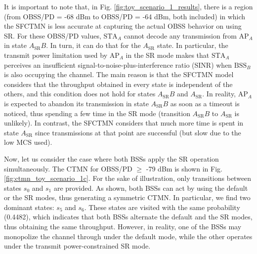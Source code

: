 \documentclass{ieeeaccess}
\begin{document}
It is important to note that, in Fig. \ref{fig:toy_scenario_1_results}, there is a region (from OBSS/PD = -68 dBm to OBSS/PD = -64 dBm, both included) in which the SFCTMN is less accurate at capturing the actual OBSS behavior on using SR. For these OBSS/PD values, $\text{STA}_A$ cannot decode any transmission from $\text{AP}_A$ in state $A_\text{SR}B$. In turn, it can do that for the $A_\text{SR}$ state. In particular, the transmit power limitation used by $\text{AP}_A$ in the SR mode makes that $\text{STA}_A$ perceives an insufficient signal-to-noise-plus-interference ratio (SINR) when $\text{BSS}_B$ is also occupying the channel. The main reason is that the SFCTMN model considers that the throughput obtained in every state is independent of the others, and this condition does not hold for states $A_\text{SR}B$ and $A_\text{SR}$. In reality, $\text{AP}_A$ is expected to abandon its transmission in state $A_\text{SR}B$ as soon as a timeout is noticed, thus spending a few time in the SR mode (transition $A_\text{SR}B$ to $A_\text{SR}$ is unlikely). In contrast, the SFCTMN considers that much more time is spent in state $A_\text{SR}$ since transmissions at that point are successful (but slow due to the low MCS used).

Now, let us consider the case where both BSSs apply the SR operation simultaneously. The CTMN for OBSS/PD $\geq$ -79 dBm is shown in Fig. \ref{fig:ctmn_toy_scenario_1c}. For the sake of illustration, only transitions between states $s_0$ and $s_1$ are provided. As shown, both BSSs can act by using the default or the SR modes, thus generating a symmetric CTMN. In particular, we find two dominant states: $s_5$  and $s_6$. These states are visited with the same probability (0.4482), which indicates that both BSSs alternate the default and the SR modes, thus obtaining the same throughput. However, in reality, one of the BSSs may monopolize the channel through under the default mode, while the other operates under the transmit power-constrained SR mode. 
\end{document}
